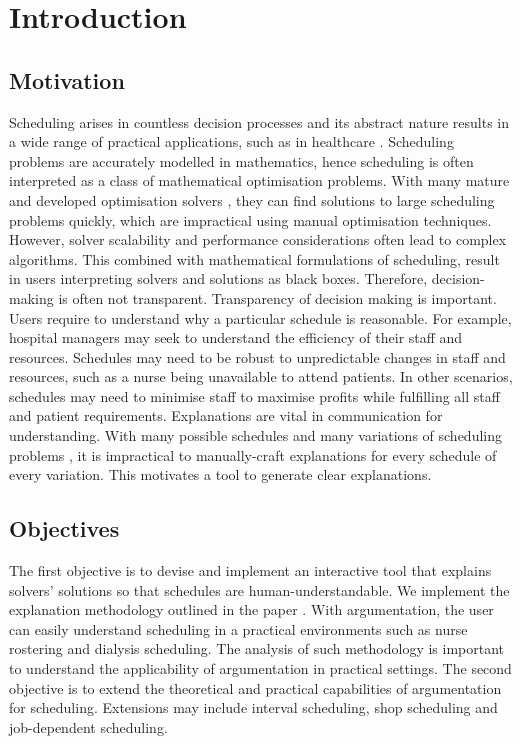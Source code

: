 \chapter{Introduction}
	
\section{Motivation}

Scheduling arises in countless decision processes and its abstract nature results in a wide range of practical applications, such as in healthcare \cite{sanr,operations}. Scheduling problems are accurately modelled in mathematics, hence scheduling is often interpreted as a class of mathematical optimisation problems. With many mature and developed optimisation solvers \cite{clp}, they can find solutions to large scheduling problems quickly, which are impractical using manual optimisation techniques. However, solver scalability and performance considerations often lead to complex algorithms. This combined with mathematical formulations of scheduling, result in users interpreting solvers and solutions as black boxes. Therefore, decision-making is often not transparent.
\linespace
Transparency of decision making is important. Users require to understand why a particular schedule is reasonable. For example, hospital managers may seek to understand the efficiency of their staff and resources. Schedules may need to be robust to unpredictable changes in staff and resources, such as a nurse being unavailable to attend patients. In other scenarios, schedules may need to minimise staff to maximise profits while fulfilling all staff and patient requirements.
\linespace
Explanations are vital in communication for understanding. With many possible schedules and many variations of scheduling problems \cite{sta}, it is impractical to manually-craft explanations for every schedule of every variation. This motivates a tool to generate clear explanations.

\section{Objectives}

The first objective is to devise and implement an interactive tool that explains solvers' solutions so that schedules are human-understandable. We implement the explanation methodology outlined in the paper \cite{aes}. With argumentation, the user can easily understand scheduling in a practical environments such as nurse rostering and dialysis scheduling. The analysis of such methodology is important to understand the applicability of argumentation in practical settings.
\linespace
The second objective is to extend the theoretical and practical capabilities of argumentation for scheduling. Extensions may include interval scheduling, shop scheduling and job-dependent scheduling.

